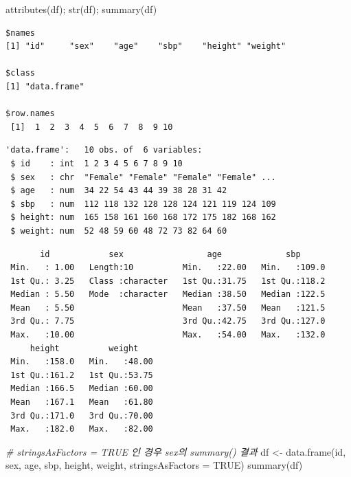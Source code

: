 \documentclass[
  11pt,
]{krantz}
\newenvironment{Shaded}{\begin{snugshade}}{\end{snugshade}}
\newcommand{\AttributeTok}[1]{\textcolor[rgb]{0.61,0.61,0.61}{#1}}
\newcommand{\CommentTok}[1]{\textcolor[rgb]{0.37,0.37,0.37}{\textit{#1}}}
\newcommand{\ConstantTok}[1]{\textcolor[rgb]{0,0,0}{#1}}
\newcommand{\FunctionTok}[1]{\textcolor[rgb]{0,0,0}{#1}}
\newcommand{\NormalTok}[1]{#1}
\newcommand{\OtherTok}[1]{\textcolor[rgb]{0.37,0.37,0.37}{#1}}
\begin{document}
\begin{Shaded}
\begin{Highlighting}[]
\FunctionTok{attributes}\NormalTok{(df); }\FunctionTok{str}\NormalTok{(df); }\FunctionTok{summary}\NormalTok{(df)}
\end{Highlighting}
\end{Shaded}

\begin{verbatim}
$names
[1] "id"     "sex"    "age"    "sbp"    "height" "weight"

$class
[1] "data.frame"

$row.names
 [1]  1  2  3  4  5  6  7  8  9 10
\end{verbatim}

\begin{verbatim}
'data.frame':   10 obs. of  6 variables:
 $ id    : int  1 2 3 4 5 6 7 8 9 10
 $ sex   : chr  "Female" "Female" "Female" "Female" ...
 $ age   : num  34 22 54 43 44 39 38 28 31 42
 $ sbp   : num  112 118 132 128 128 124 121 119 124 109
 $ height: num  165 158 161 160 168 172 175 182 168 162
 $ weight: num  52 48 59 60 48 72 73 82 64 60
\end{verbatim}

\begin{verbatim}
       id            sex                 age             sbp       
 Min.   : 1.00   Length:10          Min.   :22.00   Min.   :109.0  
 1st Qu.: 3.25   Class :character   1st Qu.:31.75   1st Qu.:118.2  
 Median : 5.50   Mode  :character   Median :38.50   Median :122.5  
 Mean   : 5.50                      Mean   :37.50   Mean   :121.5  
 3rd Qu.: 7.75                      3rd Qu.:42.75   3rd Qu.:127.0  
 Max.   :10.00                      Max.   :54.00   Max.   :132.0  
     height          weight     
 Min.   :158.0   Min.   :48.00  
 1st Qu.:161.2   1st Qu.:53.75  
 Median :166.5   Median :60.00  
 Mean   :167.1   Mean   :61.80  
 3rd Qu.:171.0   3rd Qu.:70.00  
 Max.   :182.0   Max.   :82.00  
\end{verbatim}

\begin{Shaded}
\begin{Highlighting}[]
\CommentTok{\# stringsAsFactors = TRUE 인 경우 sex의 summary() 결과}
\NormalTok{df }\OtherTok{\textless{}{-}} \FunctionTok{data.frame}\NormalTok{(id, sex, age, sbp, height, weight, }
                 \AttributeTok{stringsAsFactors =} \ConstantTok{TRUE}\NormalTok{)}
\FunctionTok{summary}\NormalTok{(df)}
\end{Highlighting}
\end{Shaded}
\end{document}
